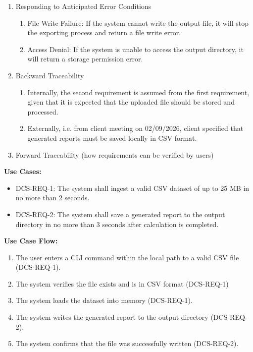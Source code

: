 \begin{enumerate}
\def\labelenumi{\alph{enumi}.}
\item
  Responding to Anticipated Error Conditions

  \begin{enumerate}
  \def\labelenumii{\roman{enumii}.}
  \item
    File Write Failure: If the system cannot write the output file, it
    will stop the exporting process and return a file write error.
  \item
    Access Denial: If the system is unable to access the output
    directory, it will return a storage permission error.
  \end{enumerate}
\item
  Backward Traceability

  \begin{enumerate}
  \def\labelenumii{\roman{enumii}.}
  \item
    Internally, the second requirement is assumed from the first
    requirement, given that it is expected that the uploaded file should
    be stored and processed.
  \item
    Externally, i.e. from client meeting on 02/09/2026, client specified
    that generated reports must be saved locally in CSV format.
  \end{enumerate}
\item
  Forward Traceability (how requirements can be verified by users)
\end{enumerate}

\textbf{Use Cases:}

\begin{itemize}
\item
  DCS-REQ-1: The system shall ingest a valid CSV dataset of up to 25 MB
  in no more than 2 seconds.
\item
  DCS-REQ-2: The system shall save a generated report to the output
  directory in no more than 3 seconds after calculation is completed.
\end{itemize}

\textbf{Use Case Flow:}

\begin{enumerate}
\def\labelenumi{\alph{enumi}.}
\item
  The user enters a CLI command within the local path to a valid CSV
  file (DCS-REQ-1).
\item
  The system verifies the file exists and is in CSV format (DCS-REQ-1)
\item
  The system loads the dataset into memory (DCS-REQ-1).
\item
  The system writes the generated report to the output directory
  (DCS-REQ-2).
\item
  The system confirms that the file was successfully written
  (DCS-REQ-2).
\end{enumerate}

